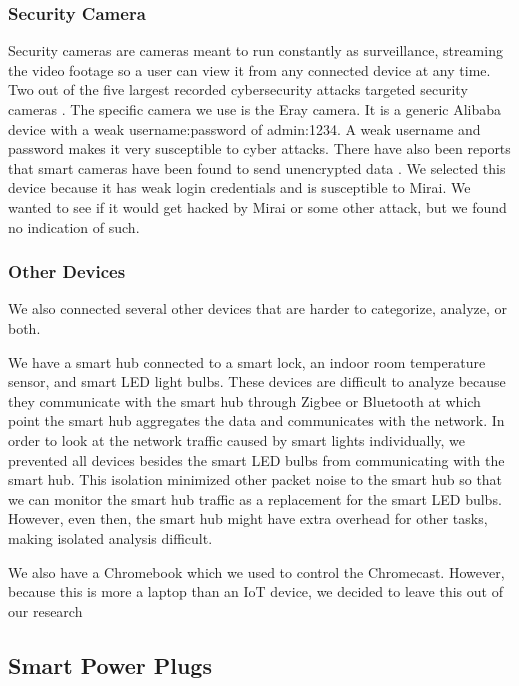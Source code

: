 \subsubsection{Security Camera}

Security cameras are cameras meant to run constantly as surveillance, streaming the video footage so a user can view it from any connected device at any time. Two out of the five largest recorded cybersecurity attacks targeted security cameras \cite{guest_2018}. The specific camera we use is the Eray camera. It is a generic Alibaba device with a weak username:password of admin:1234. A weak username and password makes it very susceptible to cyber attacks. There have also been reports that smart cameras have been found to send unencrypted data \cite{feamster_2016}. We selected this device because it has weak login credentials and is susceptible to Mirai. We wanted to see if it would get hacked by Mirai or some other attack, but we found no indication of such.

\subsubsection{Other Devices}

We also connected several other devices that are harder to categorize, analyze, or both.

We have a smart hub connected to a smart lock, an indoor room temperature sensor, and smart LED light bulbs. These devices are difficult to analyze because they communicate with the smart hub through Zigbee or Bluetooth at which point the smart hub aggregates the data and communicates with the network. In order to look at the network traffic caused by smart lights individually, we prevented all devices besides the smart LED bulbs from communicating with the smart hub. This isolation minimized other packet noise to the smart hub so that we can monitor the smart hub traffic as a replacement for the smart LED bulbs. However, even then, the smart hub might have extra overhead for other tasks, making isolated analysis difficult.

We also have a Chromebook which we used to control the Chromecast. However, because this is more a laptop than an IoT device, we decided to leave this out of our research

\subsection{Smart Power Plugs}

